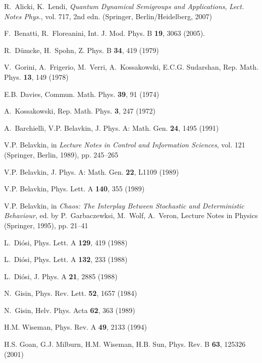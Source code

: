 \documentclass[aps,pra,reprint,amsmath,amssymb,showpacs,nofootinbib,floatfix,onecolumn,12pt]{revtex4-1}
\begin{document}
\begin{thebibliography}{100}
R.~Alicki, K.~Lendi, \emph{Quantum Dynamical Semigroups and Applications},
  \emph{Lect. Notes Phys.}, vol. 717, 2nd edn. (Springer, Berlin/Heidelberg,
  2007)

F.~Benatti, R.~Floreanini, Int. J. Mod. Phys. B \textbf{19}, 3063 (2005).
\newblock {}

R.~D{\"u}mcke, H.~Spohn, Z. Phys. B \textbf{34}, 419 (1979)

V.~Gorini, A.~Frigerio, M.~Verri, A.~Kossakowski, E.C.G. Sudarshan, Rep. Math.
  Phys. \textbf{13}, 149 (1978)

E.B. Davies, Commun. Math. Phys. \textbf{39}, 91 (1974)

A.~Kossakowski, Rep. Math. Phys. \textbf{3}, 247 (1972)

A.~Barchielli, V.P. Belavkin, J. Phys. A: Math. Gen. \textbf{24}, 1495 (1991)

V.P. Belavkin, in \emph{Lecture Notes in Control and Information Sciences},
  vol. 121 (Springer, Berlin, 1989), pp. 245--265

V.P. Belavkin, J. Phys. A: Math. Gen. \textbf{22}, L1109 (1989)

V.P. Belavkin, Phys. Lett. A \textbf{140}, 355 (1989)

V.P. Belavkin, in \emph{Chaos: The Interplay Between Stochastic and
  Deterministic Behaviour}, ed. by P.~Garbaczewksi, M.~Wolf, A.~Veron, Lecture
  Notes in Physics (Springer, 1995), pp. 21--41

L.~Di{\'o}si, Phys. Lett. A \textbf{129}, 419 (1988)

L.~Di{\'o}si, Phys. Lett. A \textbf{132}, 233 (1988)

L.~Di{\'o}si, J. Phys. A \textbf{21}, 2885 (1988)

N.~Gisin, Phys. Rev. Lett. \textbf{52}, 1657 (1984)

N.~Gisin, Helv. Phys. Acta \textbf{62}, 363 (1989)

H.M. Wiseman, Phys. Rev. A \textbf{49}, 2133 (1994)

H.S. Goan, G.J. Milburn, H.M. Wiseman, H.B. Sun, Phys. Rev. B \textbf{63},
  125326 (2001)


\end{thebibliography}
\end{document}
